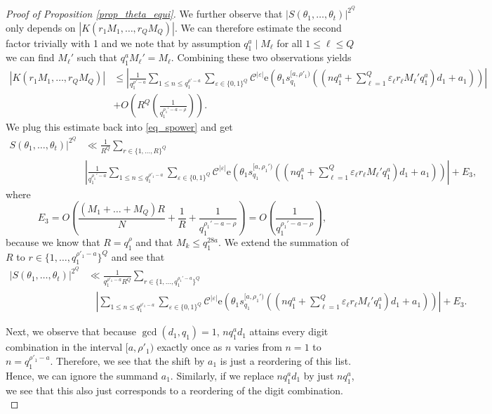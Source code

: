 \documentclass[12pt]{amsart}
\renewcommand{\leq}{\leqslant}
\theoremstyle{definition}
\numberwithin{equation}{section}
\newcommand\e{\mathrm{e}}
\numberwithin{equation}{section}
\begin{document}
\begin{proof}[Proof of Proposition \ref{prop_theta_equi}]
	We further observe that $|S(\theta_1, \dots, \theta_t)|^{2^Q}$ only depends on $|K(r_1M_1,\dots, r_QM_{Q})|$. We can therefore estimate the second factor trivially with 1 and we note that by assumption $q_1^a\mid M_{\ell}$ for all $1\leq \ell\leq Q$ we can find $M_{\ell}'$ such that $q_1^aM_{\ell}'= M_{\ell}$. Combining these two observations yields
	\begin{align*}
		|K(r_1M_1,\dots, r_QM_{Q})| &\leq \left|\frac 1{q_1^{\rho'-a}} \sum_{1\leq n \leq q_1^{\rho'-a}} \sum_{\varepsilon\in \{0,1\}^Q}\mathcal{C}^{|\varepsilon|} \e\left(\theta_1 s_{q_1}^{[a,\rho'_1)}\left(\left(nq_1^{a}+\sum_{\ell=1}^{Q}\varepsilon_{\ell}r_{\ell}M_{\ell}'q_1^{a}\right)d_1+a_1\right)\right)\right|\\
		& + O\left(R^Q\left(\frac{1}{q_1^{\rho_1'-a-\rho}}\right)\right).
	\end{align*}
	We plug this estimate back into \eqref{eq_spower} and get
	\begin{align*}
		S(\theta_1, \dots, \theta_t)|^{2^Q} &\ll \frac {1}{R^Q}\sum_{r\in\{1,\dots,R\}^Q}\\ &\left|\frac 1{q_1^{\rho_1'-a}} \sum_{1\leq n \leq q_1^{\rho'_1-a}} \sum_{\varepsilon\in \{0,1\}^Q}\mathcal{C}^{|\varepsilon|} \e\left(\theta_1 s_{q_1}^{[a,\rho_1')}\left(\left(nq_1^{a}+\sum_{\ell=1}^{Q}\varepsilon_{\ell}r_{\ell}M_{\ell}'q_1^{a}\right)d_1+a_1\right)\right)\right| + E_3,
	\end{align*}
	where
	\begin{equation*}
		E_3 = O\left(\frac{(M_1+\dots + M_{Q})R}{N}+\frac 1R + \frac{1}{q_1^{\rho_1'-a-\rho}}\right) =O\left(\frac{1}{q_1^{\rho_1'-a-\rho}}\right),
	\end{equation*}
	because we know that $R=q_1^{\rho}$ and that $M_k\leq q_1^{28a}$.
	We extend the summation of $R$ to $r\in\{1,\dots,q_1^{\rho'_1-a}\}^Q$ and see that
	\begin{align*}
		|S(\theta_1, \dots, \theta_t)|^{2^Q} &\ll \frac {1}{q_1^{\rho'_1-a}R^Q}\sum_{r\in\{1,\dots,q_1^{\rho_1'-a}\}^Q}\\
		 &\hspace{10pt}\left|\sum_{1\leq n \leq q_1^{\rho'_1-a}} \sum_{\varepsilon\in \{0,1\}^Q}\mathcal{C}^{|\varepsilon|} \e\left(\theta_1 s_{q_1}^{[a,\rho_1')}\left(\left(nq_1^{a}+\sum_{\ell=1}^{Q}\varepsilon_{\ell}r_{\ell}M_{\ell}'q_1^{a}\right)d_1+a_1\right)\right)\right|+E_3.
	\end{align*}
	
	Next, we observe that because $\gcd(d_1,q_1)=1$, $nq_1^{a}d_1$ attains every digit combination in the interval $[a,\rho'_1)$ exactly once as $n$ varies from $n=1$ to $n=q_1^{\rho'_1-a}$. Therefore, we see that the shift by $a_1$ is just a reordering of this list. Hence, we can ignore the summand $a_1$. Similarly, if we replace $nq_1^{a}d_1$ by just $nq_1^{a}$, we see that this also just corresponds to a reordering of the digit combination.\\
	

\end{proof}
\end{document}
